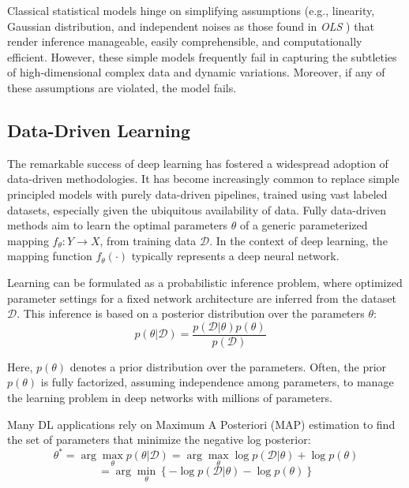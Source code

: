 Classical statistical models hinge on simplifying assumptions (e.g., linearity, Gaussian distribution, and independent noises as those found in \textit{OLS} \cite{albert_ols_review}) that render inference manageable, easily comprehensible, and computationally efficient. However, these simple models frequently fail in capturing the subtleties of high-dimensional complex data and dynamic variations. Moreover, if any of these assumptions are violated, the model fails.


\subsection{Data-Driven Learning}

The remarkable success of deep learning has fostered a widespread adoption of data-driven methodologies. It has become increasingly common to replace simple principled models with purely data-driven pipelines, trained using vast labeled datasets, especially given the ubiquitous availability of data. Fully data-driven methods aim to learn the optimal parameters $\theta$ of a generic parameterized mapping $f_{\theta}: Y \rightarrow X$, from training data $\mathcal{D}$. In the context of deep learning, the mapping function $f_{\theta}(\cdot)$ typically represents a deep neural network.

Learning can be formulated as a probabilistic inference problem, where optimized parameter settings for a fixed network architecture are inferred from the dataset $\mathcal{D}$. This inference is based on a posterior distribution over the parameters $\theta$:
\begin{equation}
p(\theta|\mathcal{D}) = \frac{p(\mathcal{D}|\theta)p(\theta)}{p(\mathcal{D})} \quad \label{eq:7}
\end{equation}

Here, $p(\theta)$ denotes a prior distribution over the parameters. Often, the prior $p(\theta)$ is fully factorized, assuming independence among parameters, to manage the learning problem in deep networks with millions of parameters.

Many DL applications rely on Maximum A Posteriori (MAP) estimation to find the set of parameters that minimize the negative log posterior:
\begin{equation}
\theta^* = \arg\max_{\theta} p(\theta|\mathcal{D}) = \arg\max_{\theta} \log p(\mathcal{D}|\theta) + \log p(\theta) 
\end{equation}
\begin{equation}
= \arg\min_{\theta} \left\{ -\log p(\mathcal{D}|\theta) - \log p(\theta) \right\}
\end{equation}


